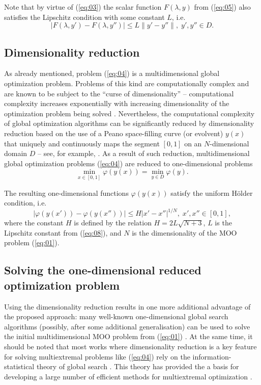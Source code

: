 \documentclass[runningheads]{llncs}
\begin{document}
Note that by virtue of (\ref{eq:03}) the scalar function $F(\lambda,y)$ from (\ref{eq:05}) also satisfies the Lipschitz condition with some constant $L$, i.e.
\begin{equation}
\label{eq:08}
|F(\lambda, y') - F(\lambda, y'')| \leq L\|y' - y''\|, \; y',y''\in D.
\end{equation}

\subsection{Dimensionality reduction} 
\label{subsec:32}

As already mentioned, problem (\ref{eq:04}) is a multidimensional global optimization problem. Problems of this kind are computationally complex and are known to be subject to the ``curse of dimensionality'' -- computational complexity increases exponentially with increasing dimensionality of the optimization problem being solved \cite{c13,c14,c15,c16,c17,c18,c19,c20}. Nevertheless, the computational complexity of global optimization algorithms can be significantly reduced by dimensionality reduction based on the use of a Peano space-filling curve (or evolvent) $y(x)$ that uniquely and continuously maps the segment $[0,1]$ on an $N$-dimensional domain $D$ -- see, for example, \cite{c15,c21}. As a result of such reduction, multidimensional global optimization problems (\ref{eq:04}) are reduced to one-dimensional problems
\begin{equation}
\label{eq:09}
\min_{x \in [0,1]} \varphi (y(x))= \min_{y \in D} \varphi(y).
\end{equation}

The resulting one-dimensional functions $\varphi(y(x))$ satisfy the uniform H{\" o}lder condition, i.e.
\begin{equation}
\label{eq:10}
|\varphi (y(x'))- \varphi (y(x''))| \leq H |x'-x''|^{1/N}, \; x',x''\in[0,1],
\end{equation}
where the constant $H$ is defined by the relation $H=2L\sqrt{N+3}$, $L$ is the Lipschitz constant from (\ref{eq:08}), and $N$ is the dimensionality of the MOO problem (\ref{eq:01}). 


\subsection{Solving the one-dimensional reduced optimization problem} 
\label{subsec:33}

Using the dimensionality reduction results in one more additional advantage of the proposed approach: many well-known one-dimensional global search algorithms (possibly, after some additional generalisation) can be used to solve the initial multidimensional MOO problem from (\ref{eq:01}) \cite{c22,c23,c24,c25,c26,c27,c28,c29}. At the same time, it should be noted that most works where dimensionality reduction is a key feature for solving multiextremal problems like (\ref{eq:04}) rely on the information-statistical theory of global search \cite{c15}. This theory has provided the a basis for developing a large number of efficient methods for multiextremal optimization \cite{c28,c29,c30,c31,c32,c33,c34,c35,c36,c37}.
\end{document}
